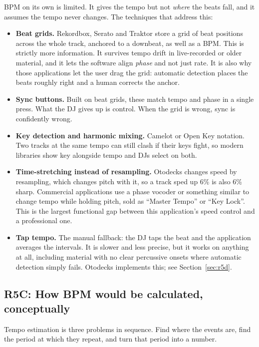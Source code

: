 \documentclass[11pt,a4paper]{article}
\begin{document}
BPM on its own is limited. It gives the tempo but not \emph{where} the beats fall,
and it assumes the tempo never changes. The techniques that address this:

\begin{itemize}[leftmargin=1.4em]
  \item \textbf{Beat grids.} Rekordbox, Serato and Traktor store a grid of beat
    positions across the whole track, anchored to a downbeat, as well as a BPM.
    This is strictly more information. It survives tempo drift in live-recorded or
    older material, and it lets the software align \emph{phase} and not just rate.
    It is also why those applications let the user drag the grid: automatic
    detection places the beats roughly right and a human corrects the anchor.
  \item \textbf{Sync buttons.} Built on beat grids, these match tempo and phase in
    a single press. What the DJ gives up is control. When the grid is wrong, sync
    is confidently wrong.
  \item \textbf{Key detection and harmonic mixing.} Camelot or Open Key notation.
    Two tracks at the same tempo can still clash if their keys fight, so modern
    libraries show key alongside tempo and DJs select on both.
  \item \textbf{Time-stretching instead of resampling.} Otodecks changes speed by
    resampling, which changes pitch with it, so a track sped up 6\% is also 6\%
    sharp. Commercial applications use a phase vocoder or something similar to
    change tempo while holding pitch, sold as ``Master Tempo'' or ``Key Lock''.
    This is the largest functional gap between this application's speed control
    and a professional one.
  \item \textbf{Tap tempo.} The manual fallback: the DJ taps the beat and the
    application averages the intervals. It is slower and less precise, but it
    works on anything at all, including material with no clear percussive onsets
    where automatic detection simply fails. Otodecks implements this; see
    Section~\ref{sec:r5d}.
\end{itemize}

\subsection{R5C: How BPM would be calculated, conceptually}

Tempo estimation is three problems in sequence. Find where the events are, find
the period at which they repeat, and turn that period into a number.
\end{document}

